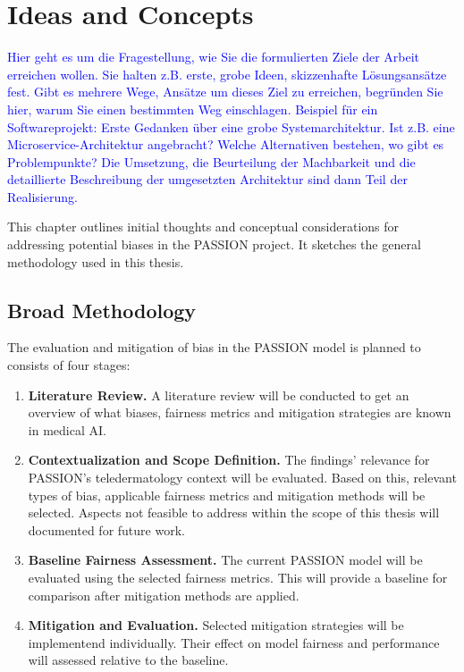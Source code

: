 \documentclass[12pt, a4paper, oneside]{book}   	%
\newcommand{\baaCriteria}[1]{\textcolor{blue}{#1}}
\begin{document}
	\chapter{Ideas and Concepts}
		\baaCriteria{Hier geht es um die Fragestellung, wie Sie die formulierten Ziele der Arbeit erreichen wollen. Sie halten z.B. erste, grobe Ideen, skizzenhafte Lösungsansätze fest. Gibt es mehrere Wege, Ansätze um dieses Ziel zu erreichen, begründen Sie hier, warum Sie einen bestimmten Weg einschlagen. Beispiel für ein Softwareprojekt: Erste Gedanken über eine grobe Systemarchitektur. Ist z.B. eine Microservice-Architektur angebracht? Welche Alternativen bestehen, wo gibt es Problempunkte? Die Umsetzung, die Beurteilung der Machbarkeit und die detaillierte Beschreibung der umgesetzten Architektur sind dann Teil der Realisierung.}
					
		This chapter outlines initial thoughts and conceptual considerations for addressing potential biases in the PASSION project. It sketches the general methodology used in this thesis.
		
		\section{Broad Methodology}
			The evaluation and mitigation of bias in the PASSION model is planned to consists of four stages:
			\begin{enumerate}
				\item \textbf{Literature Review.} A literature review will be conducted to get an overview of what biases, fairness metrics and mitigation strategies are known in medical \gls{AI}.
				
				\item \textbf{Contextualization and Scope Definition.} The findings' relevance for PASSION's \gls{teledermatology} context will be evaluated. Based on this, relevant types of bias, applicable fairness metrics and mitigation methods will be selected. Aspects not feasible to address within the scope of this thesis will documented for future work.
				
				\item \textbf{Baseline Fairness Assessment.} The current PASSION model will be evaluated using the selected fairness metrics. This will provide a baseline for comparison after mitigation methods are applied.
				
				\item \textbf{Mitigation and Evaluation.} Selected mitigation strategies will be implementend individually. Their effect on model fairness and performance will assessed relative to the baseline.
			\end{enumerate}
		
\end{document}
